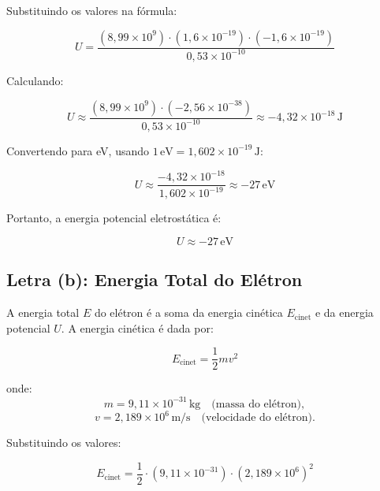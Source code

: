 \documentclass[a4paper,12pt]{article}
\begin{document}
\begin{flushleft}
Substituindo os valores na fórmula:

\begin{equation}
U = \frac{(8,99 \times 10^9) \cdot (1,6 \times 10^{-19}) \cdot (-1,6 \times 10^{-19})}{0,53 \times 10^{-10}}
\end{equation}

Calculando:

\begin{equation}
U \approx \frac{(8,99 \times 10^9) \cdot (-2,56 \times 10^{-38})}{0,53 \times 10^{-10}} \approx -4,32 \times 10^{-18} \, \text{J}
\end{equation}

Convertendo para eV, usando \( 1 \, \text{eV} = 1,602 \times 10^{-19} \, \text{J} \):

\begin{equation}
U \approx \frac{-4,32 \times 10^{-18}}{1,602 \times 10^{-19}} \approx -27 \, \text{eV}
\end{equation}

Portanto, a energia potencial eletrostática é:

\begin{equation}
\boxed{ U \approx -27 \, \text{eV}}
\end{equation}

\subsection*{Letra (b): Energia Total do Elétron}

A energia total \( E \) do elétron é a soma da energia cinética \( E_{\text{cinet}} \) e da energia potencial \( U \). A energia cinética é dada por:

\begin{equation}
E_{\text{cinet}} = \frac{1}{2} m v^2
\end{equation}

onde:
\begin{equation}
m = 9,11 \times 10^{-31} \, \text{kg} \quad \text{(massa do elétron)},
\end{equation}
\begin{equation}
v = 2,189 \times 10^6 \, \text{m/s} \quad \text{(velocidade do elétron)}.
\end{equation}

Substituindo os valores:

\begin{equation}
E_{\text{cinet}} = \frac{1}{2} \cdot (9,11 \times 10^{-31}) \cdot (2,189 \times 10^6)^2
\end{equation}


\end{flushleft}
\end{document}
